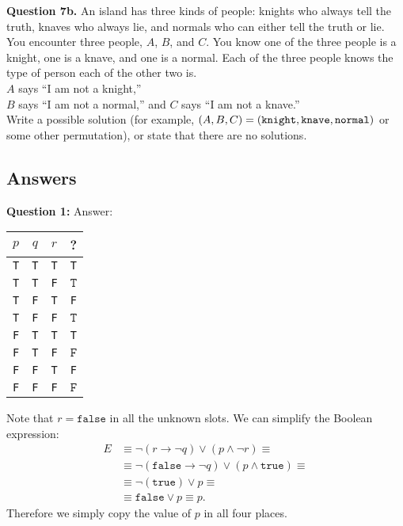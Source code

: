 \documentclass[jou]{apa6}
\begin{document}
\vspace{10pt}
{\bf Question 7b.} 
An island has three kinds of people: knights who always
tell the truth, knaves who always lie, and normals who can either tell the truth or lie. 
You encounter three people, $A$, $B$, and $C$. 
You know one of the three people is a knight, one is a knave, and one is a normal. Each of the three
people knows the type of person each of the other two is.\\
$A$ says ``I am not a knight,''\\
$B$ says ``I am not a normal,'' and 
$C$ says ``I am not a knave.''\\
Write a possible solution (for example, $(A,B,C)=({\tt knight},{\tt knave},{\tt normal})$ or 
some other permutation), or state that there are no solutions.


\newpage 

\subsection{Answers}


{\bf Question 1:} Answer:

\begin{tabular}{ c | c | c | c }
$p$ & $q$ & $r$ & ? \\ \hline
{\tt T} & {\tt T} & {\tt T} & {\tt T} \\ \hline
{\tt T} & {\tt T} & {\tt F} & $\boxed{\mathtt{T}}$ \\ \hline
{\tt T} & {\tt F} & {\tt T} & {\tt F} \\ \hline
{\tt T} & {\tt F} & {\tt F} & $\boxed{\mathtt{T}}$ \\ \hline
{\tt F} & {\tt T} & {\tt T} & {\tt T} \\ \hline
{\tt F} & {\tt T} & {\tt F} & $\boxed{\mathtt{F}}$ \\ \hline
{\tt F} & {\tt F} & {\tt T} & {\tt F} \\ \hline
{\tt F} & {\tt F} & {\tt F} & $\boxed{\mathtt{F}}$ \\ \hline
\end{tabular}

\vspace{3pt}
\noindent
Note that $r=\mathtt{false}$ in all the unknown slots. 
We can simplify the Boolean expression:
\begin{align}
E & \equiv \neg(r \rightarrow \neg q) \vee (p \wedge \neg r) \equiv \nonumber \\
  & \equiv \neg(\mathtt{false} \rightarrow \neg q) \vee 
(p \wedge \mathtt{true}) \equiv  \nonumber \\
  & \equiv \neg(\mathtt{true}) \vee p \equiv \nonumber \\
  & \equiv \mathtt{false} \vee p \equiv p. \nonumber
\end{align}
Therefore we simply copy the value of $p$ in all four places.
\end{document}
